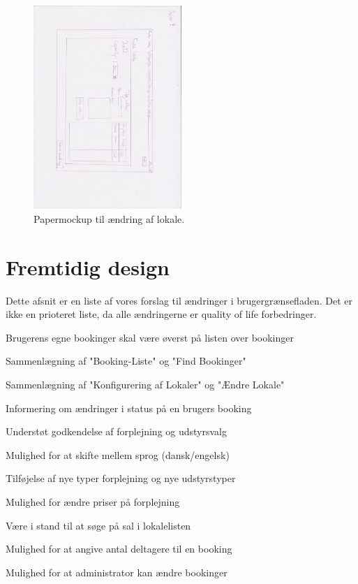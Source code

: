 \begin{figure}[h!]
  \centering
    \includegraphics[angle=90, width=0.5\textwidth]{Appendix/GUI-Prototype/PaperMockup/AendreLokale_001}
  \caption{Papermockup til ændring af lokale.}
\label{Design_G_Development_AendreLokale}
\end{figure} 

\section{Fremtidig design}
\label{Design_G_Future}
Dette afsnit er en liste af vores forslag til ændringer i brugergrænsefladen. Det er ikke en prioteret liste, da alle ændringerne er quality of life forbedringer.

\begin{my_itemize}
\item{Brugerens egne bookinger skal være øverst på listen over bookinger}
\item{Sammenlægning af "Booking-Liste" og "Find Bookinger"}
\item{Sammenlægning af "Konfigurering af Lokaler" og "Ændre Lokale"}
\item{Informering om ændringer i status på en brugers booking}
\item{Understøt godkendelse af forplejning og udstyrsvalg}
\item{Mulighed for at skifte mellem sprog (dansk/engelsk)}
\item{Tilføjelse af nye typer forplejning og nye udstyrstyper}
\item{Mulighed for ændre priser på forplejning}
\item{Være i stand til at søge på sal i lokalelisten}
\item{Mulighed for at angive antal deltagere til en booking}
\item{Mulighed for at administrator kan ændre bookinger}
\end{my_itemize}